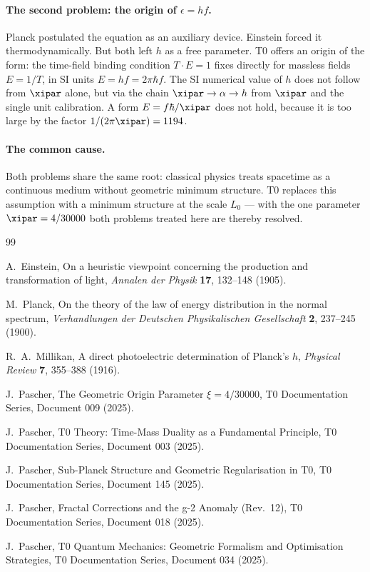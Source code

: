 \paragraph{The second problem: the origin of $\epsilon = hf$.}
Planck postulated the equation as an auxiliary device. Einstein forced it 
thermodynamically. But both left $h$ as a free parameter. T0 offers an origin of the form: 
the time-field binding condition $T \cdot E = 1$ fixes directly for massless fields 
$E = 1/T$, in SI units $E = hf = 2\pi\hbar f$. The SI numerical value of $h$ does not 
follow from $\xipar$ alone, but via the chain $\xipar\to\alpha\to h$ from $\xipar$ and the 
single unit calibration. A form $E = f\hbar/\xipar$ does not hold, because it is too large 
by the factor $1/(2\pi\xipar) = 1194$.

\paragraph{The common cause.}
Both problems share the same root: classical physics treats spacetime as a 
continuous medium without geometric minimum structure. T0 replaces this assumption 
with a minimum structure at the scale $L_0$ — with the one parameter $\xipar = 4/30000$ 
both problems treated here are thereby resolved.

\begin{thebibliography}{99}

A.~Einstein,
\newblock On a heuristic viewpoint concerning the production and transformation 
of light,
\newblock \emph{Annalen der Physik} \textbf{17}, 132–148 (1905).

M.~Planck,
\newblock On the theory of the law of energy distribution in the normal spectrum,
\newblock \emph{Verhandlungen der Deutschen Physikalischen Gesellschaft} \textbf{2}, 
237–245 (1900).

R.~A.~Millikan,
\newblock A direct photoelectric determination of Planck's $h$,
\newblock \emph{Physical Review} \textbf{7}, 355–388 (1916).

J.~Pascher,
\newblock The Geometric Origin Parameter $\xi = 4/30000$,
\newblock T0 Documentation Series, Document 009 (2025).

J.~Pascher,
\newblock T0 Theory: Time-Mass Duality as a Fundamental Principle,
\newblock T0 Documentation Series, Document 003 (2025).

J.~Pascher,
\newblock Sub-Planck Structure and Geometric Regularisation in T0,
\newblock T0 Documentation Series, Document 145 (2025).

J.~Pascher,
\newblock Fractal Corrections and the g-2 Anomaly (Rev.\ 12),
\newblock T0 Documentation Series, Document 018 (2025).

J.~Pascher,
\newblock T0 Quantum Mechanics: Geometric Formalism and Optimisation Strategies,
\newblock T0 Documentation Series, Document 034 (2025).

\end{thebibliography}
